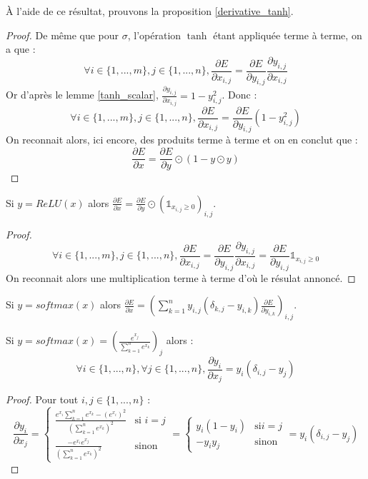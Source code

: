 À l'aide de ce résultat, prouvons la proposition \ref{derivative_tanh}.

\begin{proof}
De même que pour $\sigma$, l'opération $\tanh$ étant appliquée terme à terme, on a que :
$$
\forall i \in \{1, ..., m\}, j \in \{1, ..., n\}, \frac{\partial E}{\partial x_{i, j}} = \frac{\partial E}{\partial y_{i, j}}\frac{\partial y_{i, j}}{\partial x_{i, j}}
$$
Or d'après le lemme \ref{tanh_scalar}, $\frac{\partial y_{i, j}}{\partial x_{i, j}} = 1 - y_{i, j}^2$. Donc :
$$
\forall i \in \{1, ..., m\}, j \in \{1, ..., n\}, \frac{\partial E}{\partial x_{i, j}} = \frac{\partial E}{\partial y_{i, j}}(1 - y_{i, j}^2)
$$
On reconnait alors, ici encore, des produits terme à terme et on en conclut que :
$$
\frac{\partial E}{\partial x} = \frac{\partial E}{\partial y} \odot (1 - y \odot y)
$$
\end{proof}

\begin{proposition}
Si $y = ReLU(x)$ alors $\frac{\partial E}{\partial x} = \frac{\partial E}{\partial y} \odot (\mathds{1}_{x_{i,j} \geq 0})_{i,j}$.
\end{proposition}

\begin{proof}
$$
\forall i \in \{1, ..., m\}, j \in \{1, ..., n\}, \frac{\partial E}{\partial x_{i, j}} = \frac{\partial E}{\partial y_{i, j}}\frac{\partial y_{i, j}}{\partial x_{i, j}} = \frac{\partial E}{\partial y_{i, j}}\mathds{1}_{x_{i,j} \geq 0}
$$
On reconnait alors une multiplication terme à terme d'où le résulat annoncé.
\end{proof}

\begin{proposition}
Si $y = softmax(x)$ alors $\frac{\partial E}{\partial x} = \left(\sum_{k = 1}^{n}{y_{i,j}(\delta_{k,j} - y_{i,k})\frac{\partial E}{\partial y_{i, k}}}\right)_{i,j}$.
\label{derivative_softmax}
\end{proposition}

\begin{lemma}
Si $y = softmax(x) = \left(\frac{e^{x_j}}{\sum_{k = 1}^{n}{e^{x_k}}}\right)_j$ alors :
$$
\forall i \in \{1, ..., n\}, \forall j \in \{1, ..., n\}, \frac{\partial y_i}{\partial x_j} = y_i(\delta_{i, j} - y_j)
$$
\end{lemma}

\begin{proof}
Pour tout $i, j \in \{1, ..., n\}$ :
$$
\frac{\partial y_i}{\partial x_j} = 
\left\{
\begin{array}{rl}
	\frac{e^{x_i}\sum_{k = 1}^{n}{e^{x_k}} - (e^{x_i})^2}{(\sum_{k = 1}^{n}{e^{x_k}})^2} & \text{si } i = j \\
	\frac{-e^{x_i}e^{x_j}}{(\sum_{k = 1}^{n}{e^{x_k}})^2} & \text{sinon}
\end{array}
\right.
=
\left\{
\begin{array}{rl}
	y_i(1 - y_i) & \text{si} i = j \\ 
	-y_iy_j & \text{sinon}
\end{array}
\right.
=
y_i(\delta_{i, j} - y_j)
$$
\end{proof}

